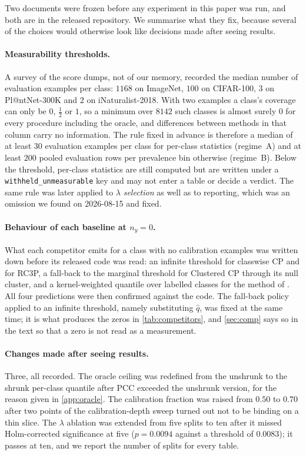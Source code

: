 Two documents were frozen before any experiment in this paper was run, and both are in the
released repository. We summarise what they fix, because several of the choices would otherwise
look like decisions made after seeing results.

\paragraph{Measurability thresholds.} A survey of the score dumps, not of our memory, recorded
the median number of evaluation examples per class: $1168$ on ImageNet, $100$ on CIFAR-100,
$3$ on Pl@ntNet-300K and $2$ on iNaturalist-2018. With two examples a class's coverage can only
be $0$, $\tfrac12$ or $1$, so a minimum over $8142$ such classes is almost surely $0$ for every
procedure including the oracle, and differences between methods in that column carry no
information. The rule fixed in advance is therefore a median of at least $30$ evaluation
examples per class for per-class statistics (regime~A) and at least $200$ pooled evaluation rows
per prevalence bin otherwise (regime~B). Below the threshold, per-class statistics are still
computed but are written under a \texttt{withheld\_unmeasurable} key and may not enter a table
or decide a verdict. The same rule was later applied to $\lambda$ \emph{selection} as well as to
reporting, which was an omission we found on 2026-08-15 and fixed.

\paragraph{Behaviour of each baseline at $n_y=0$.} What each competitor emits for a class with
no calibration examples was written down before its released code was read: an infinite
threshold for classwise CP and for RC3P, a fall-back to the marginal threshold for Clustered CP
through its null cluster, and a kernel-weighted quantile over labelled classes for the method of
\citet{ding2026conformal}. All four predictions were then confirmed against the code. The
fall-back policy applied to an infinite threshold, namely substituting $\hat q$, was fixed at
the same time; it is what produces the zeros in \cref{tab:competitors}, and \cref{sec:comp}
says so in the text so that a zero is not read as a measurement.

\paragraph{Changes made after seeing results.} Three, all recorded. The oracle ceiling was
redefined from the unshrunk to the shrunk per-class quantile after PCC exceeded the unshrunk
version, for the reason given in \cref{app:oracle}. The calibration fraction was raised from
$0.50$ to $0.70$ after two points of the calibration-depth sweep turned out not to be binding on
a thin slice. The $\lambda$ ablation was extended from five splits to ten after it missed
Holm-corrected significance at five ($p=0.0094$ against a threshold of $0.0083$); it passes at
ten, and we report the number of splits for every table.

